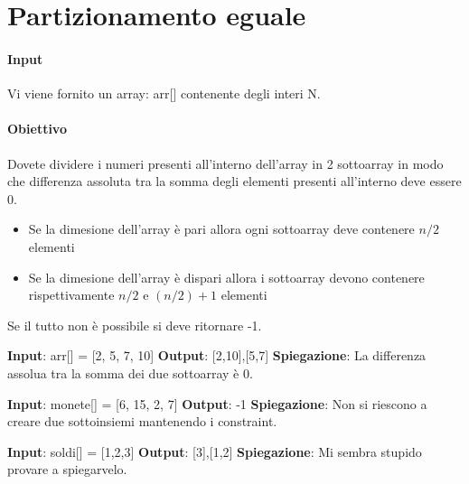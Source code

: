 \newpage
\thispagestyle{chapterInit}
\section*{Partizionamento eguale}
    \paragraph{Input} Vi viene fornito un array: arr[] contenente degli interi N.
    \paragraph{Obiettivo} Dovete dividere i numeri presenti all'interno dell'array in 2 sottoarray in modo che differenza assoluta tra la somma degli elementi presenti all'interno deve essere 0.
    \begin{itemize}
        \item Se la dimesione dell'array è pari allora ogni sottoarray deve contenere $n/2$ elementi
        \item Se la dimesione dell'array è dispari allora i sottoarray devono contenere rispettivamente $n/2$ e $(n/2)+1$ elementi
    \end{itemize}
    Se il tutto non è possibile si deve ritornare -1.
    \begin{esempio}
        \newline
        \textbf{Input}: arr[] = [2, 5, 7, 10]
        \newline
        \textbf{Output}: [2,10],[5,7]
        \newline
        \textbf{Spiegazione}: La differenza assolua tra la somma dei due sottoarray è 0.
    \end{esempio}
    \begin{esempio}
        \newline
        \textbf{Input}: monete[] = [6, 15, 2, 7]
        \newline
        \textbf{Output}: -1
        \newline
        \textbf{Spiegazione}: Non si riescono a creare due sottoinsiemi mantenendo i constraint.
    \end{esempio}
    \begin{esempio}
        \newline
        \textbf{Input}: soldi[] = [1,2,3]
        \newline
        \textbf{Output}: [3],[1,2]
        \newline
        \textbf{Spiegazione}: Mi sembra stupido provare a spiegarvelo.
    \end{esempio}

